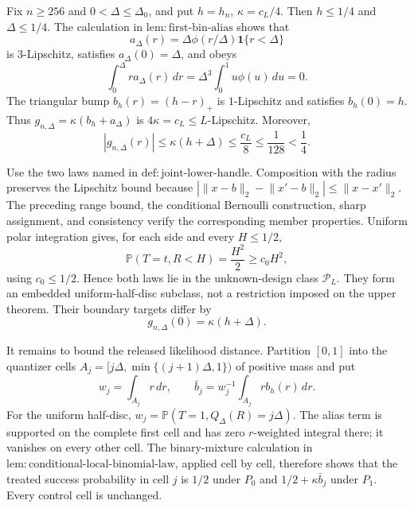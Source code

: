 Fix \(n\geq256\) and \(0<\Delta\leq\Delta_0\), and put \(h=h_n\), \(\kappa=c_L/4\).  Then \(h\leq1/4\) and \(\Delta\leq1/4\).  The calculation in \(\mathrm{lem:first\text{-}bin\text{-}alias}\) shows that
\[
 a_\Delta(r)=\Delta\phi(r/\Delta)\mathbf1\{r<\Delta\}
\]
is \(3\)-Lipschitz, satisfies \(a_\Delta(0)=\Delta\), and obeys
\[
 \int_0^\Delta r a_\Delta(r)\,dr
 =\Delta^3\int_0^1u\phi(u)\,du=0.
\]
The triangular bump \(b_h(r)=(h-r)_+\) is \(1\)-Lipschitz and satisfies \(b_h(0)=h\).  Thus \(g_{n,\Delta}=\kappa(b_h+a_\Delta)\) is \(4\kappa=c_L\leq L\)-Lipschitz.  Moreover,
\[
 |g_{n,\Delta}(r)|\leq\kappa(h+\Delta)\leq\frac{c_L}{8}\leq\frac1{128}<\frac14.
\]

Use the two laws named in \(\mathrm{def:joint\text{-}lower\text{-}handle}\).  Composition with the radius preserves the Lipschitz bound because \(|\lVert x-b\rVert_2-\lVert x'-b\rVert_2|\leq\lVert x-x'\rVert_2\).  The preceding range bound, the conditional Bernoulli construction, sharp assignment, and consistency verify the corresponding member properties.  Uniform polar integration gives, for each side and every \(H\leq1/2\),
\[
 \mathbb P(T=t,R<H)=\frac{H^2}{2}\geq c_0H^2,
\]
using \(c_0\leq1/2\).  Hence both laws lie in the unknown-design class \(\mathcal P_L\).  They form an embedded uniform-half-disc subclass, not a restriction imposed on the upper theorem.  Their boundary targets differ by
\[
 g_{n,\Delta}(0)=\kappa(h+\Delta).
\]

It remains to bound the released likelihood distance.  Partition \([0,1]\) into the quantizer cells \(A_j=[j\Delta,\min\{(j+1)\Delta,1\})\) of positive mass and put
\[
 w_j=\int_{A_j}r\,dr,
 \qquad
 \bar b_j=w_j^{-1}\int_{A_j}rb_h(r)\,dr.
\]
For the uniform half-disc, \(w_j=\mathbb P(T=1,Q_\Delta(R)=j\Delta)\).  The alias term is supported on the complete first cell and has zero \(r\)-weighted integral there; it vanishes on every other cell.  The binary-mixture calculation in \(\mathrm{lem:conditional\text{-}local\text{-}binomial\text{-}law}\), applied cell by cell, therefore shows that the treated success probability in cell \(j\) is \(1/2\) under \(P_0\) and \(1/2+\kappa\bar b_j\) under \(P_1\).  Every control cell is unchanged.

